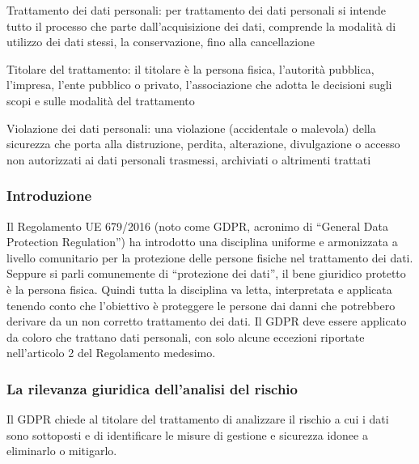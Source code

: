 Trattamento dei dati personali: per trattamento dei dati personali si intende tutto il processo che parte dall’acquisizione dei dati, comprende la modalità di utilizzo dei dati stessi, la conservazione, fino alla cancellazione 

Titolare del trattamento: il titolare è la persona fisica, l'autorità pubblica, l'impresa, l'ente pubblico o privato, l'associazione che adotta le decisioni sugli scopi e sulle modalità del trattamento

Violazione dei dati personali: una violazione (accidentale o malevola) della sicurezza che porta alla distruzione, perdita, alterazione, divulgazione o accesso non autorizzati ai dati personali trasmessi, archiviati o altrimenti trattati
\subsubsection{Introduzione}
\cite{gdpr}
\cite{gdpr2}
Il Regolamento UE 679/2016 (noto come GDPR, acronimo di “General Data Protection Regulation”) ha introdotto una disciplina uniforme e armonizzata a livello comunitario per la protezione delle persone fisiche nel trattamento dei dati.
Seppure si parli comunemente di “protezione dei dati”, il bene giuridico protetto è la
persona fisica. Quindi tutta la disciplina va letta, interpretata e applicata tenendo conto
che l’obiettivo è proteggere le persone dai danni che potrebbero derivare da un non corretto trattamento dei dati.
Il GDPR deve essere applicato da coloro che trattano dati personali, con solo alcune
eccezioni riportate nell’articolo 2 del Regolamento medesimo.
\subsubsection{La rilevanza giuridica dell’analisi del rischio}
Il GDPR chiede al titolare del trattamento di analizzare il rischio a cui i dati sono sottoposti e di identificare le misure di gestione e sicurezza idonee a eliminarlo o mitigarlo.
